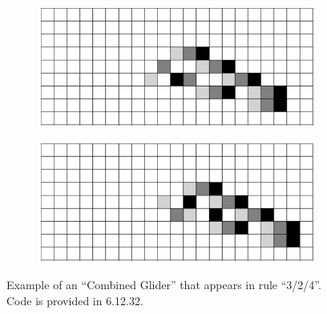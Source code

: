 \documentclass[12pt]{article}
\numberwithin{figure}{section} %
\begin{document}
\begin{figure}[H]
\begin{subfigure}{0.45\textwidth}
     	\subcaption{}
   	\end{subfigure}
	\newline
	\begin{subfigure}{0.45\textwidth}
     	\includegraphics[width=\linewidth]{Section4/35.10}
     	\subcaption{}
   	\end{subfigure}
    	\begin{subfigure}{0.45\textwidth}
     	\includegraphics[width=\linewidth]{Section4/35.11}
     	\subcaption{}
   	\end{subfigure}
   \caption{Example of an “Combined Glider” that appears in rule “3/2/4”. Code is provided in 6.12.32.}
   \label{fig:combined glider}
\end{figure}
\end{document}
